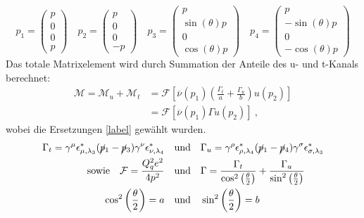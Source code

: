 \begin{equation}
	p_1 = \left(\begin{array}{c}p \\ 0 \\ 0 \\ p\end{array}\right) \quad 	p_2 = \left(\begin{array}{c}p \\ 0 \\ 0 \\ -p\end{array}\right) \quad p_3 = \left(\begin{array}{c}p \\ \sin(\theta)p \\ 0 \\ \cos(\theta)p \end{array}\right) \quad p_4 = \left(\begin{array}{c}p \\ -\sin(\theta)p \\ 0 \\ -\cos(\theta)p \end{array}\right)
\end{equation}
Das totale Matrixelement wird durch Summation der Anteile des u- und t-Kanals berechnet: 
\begin{equation}
\begin{aligned}
\mathcal{M} = \mathcal{M}_u + \mathcal{M}_t &= \mathcal{F} \left[\overline{\nu}(p_1) \left(\frac{\Gamma_t}{a}  +
\frac{\Gamma_u}{b} \right) u(p_2) \right] \\
&= \mathcal{F} \left[ \overline{\nu}(p_1) \Gamma u(p_2)\right]~,
\end{aligned}
\end{equation}
wobei die Ersetzungen \autoref{label} gewählt wurden.
\begin{equation}
\begin{split}
\Gamma_t = \gamma^\mu \epsilon^*_{\mu, \lambda_3} (\cancel{p}_1- \cancel{p}_3)  \gamma^\nu \epsilon^*_{\nu, \lambda_4} \quad &\text{und} \quad \Gamma_u = \gamma^\rho \epsilon^*_{\rho, \lambda_4} (\cancel{p}_1- \cancel{p}_4)  \gamma^\sigma \epsilon^*_{\sigma, \lambda_3} \\
\text{sowie} \quad \mathcal{F} = \frac{Q_q^2e^2}{4p^2} \quad &\text{und} \quad \Gamma = \frac{\Gamma_t}{\cos^2\left(\frac{\theta}{2}\right)}  +
\frac{\Gamma_u}{\sin^2\left(\frac{\theta}{2}\right)} \\
\cos^2\left(\frac{\theta}{2}\right) = a \quad &\text{und} \quad \sin^2\left(\frac{\theta}{2}\right) = b
\end{split}
\end{equation}
